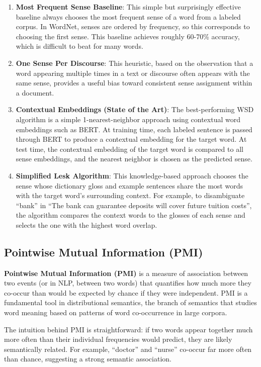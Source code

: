 \documentclass[11pt,a4paper]{article}
\begin{document}
\begin{enumerate}
    \item \textbf{Most Frequent Sense Baseline}: This simple but surprisingly effective baseline always chooses the most frequent sense of a word from a labeled corpus. In WordNet, senses are ordered by frequency, so this corresponds to choosing the first sense. This baseline achieves roughly 60-70\% accuracy, which is difficult to beat for many words.
    \item \textbf{One Sense Per Discourse}: This heuristic, based on the observation that a word appearing multiple times in a text or discourse often appears with the same sense, provides a useful bias toward consistent sense assignment within a document.
    \item \textbf{Contextual Embeddings (State of the Art)}: The best-performing WSD algorithm is a simple 1-nearest-neighbor approach using contextual word embeddings such as BERT. At training time, each labeled sentence is passed through BERT to produce a contextual embedding for the target word. At test time, the contextual embedding of the target word is compared to all sense embeddings, and the nearest neighbor is chosen as the predicted sense.
    \item \textbf{Simplified Lesk Algorithm}: This knowledge-based approach chooses the sense whose dictionary gloss and example sentences share the most words with the target word's surrounding context. For example, to disambiguate ``bank'' in ``The bank can guarantee deposits will cover future tuition costs'', the algorithm compares the context words to the glosses of each sense and selects the one with the highest word overlap.
\end{enumerate}

\subsection{Pointwise Mutual Information (PMI)}

\textbf{Pointwise Mutual Information (PMI)} is a measure of association between two events (or in NLP, between two words) that quantifies how much more they co-occur than would be expected by chance if they were independent. PMI is a fundamental tool in distributional semantics, the branch of semantics that studies word meaning based on patterns of word co-occurrence in large corpora.

The intuition behind PMI is straightforward: if two words appear together much more often than their individual frequencies would predict, they are likely semantically related. For example, ``doctor'' and ``nurse'' co-occur far more often than chance, suggesting a strong semantic association.
\end{document}
